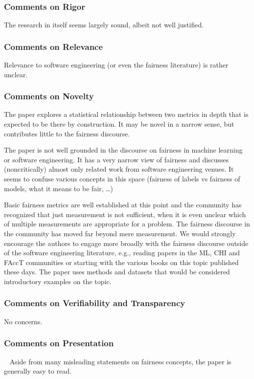 \documentclass[conference]{IEEEtran}
\begin{document}
\subsubsection{Comments on Rigor}
The research in itself seems largely sound, albeit not well justified.

\subsubsection{Comments on Relevance}
Relevance to software engineering (or even the fairness literature) is
rather unclear.

\subsubsection{Comments on Novelty}
The paper explores a statistical relationship between two metrics in
depth that is expected to be there by construction. It may be novel in
a narrow sense, but contributes little to the fairness discourse.

The paper is not well grounded in the discourse on fairness in machine
learning or software engineering. It has a very narrow view of
fairness and discusses (noncritically) almost only related work from
software engineering venues. It seems to confuse various concepts in
this space (fairness of labels vs fairness of models, what it means to
be fair, …)

Basic fairness metrics are well established at this point and the
community has recognized that just measurement is not sufficient, when
it is even unclear which of multiple measurements are appropriate for
a problem. The fairness discourse in the community has moved far
beyond mere measurement. We would strongly encourage the authors to
engage more broadly with the fairness discourse outside of the
software engineering literature, e.g., reading papers in the ML, CHI
and FAccT communities or starting with the various books on this topic
published these days. The paper uses methods and datasets that would
be considered introductory examples on the topic.

\subsubsection{Comments on Verifiability and Transparency}
No concerns.

\subsubsection{Comments on Presentation}~\label{sec:509a-presentation}
Aside from many misleading statements on fairness concepts, the paper
is generally easy to read.
\end{document}
